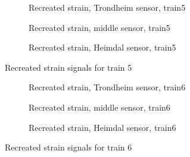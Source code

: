 \begin{figure}[htpb]
  \begin{subfigure}[t]{0.9\textwidth}
    \centering
    
    \caption{Recreated strain, Trondheim sensor, train5} %
    \label{recreated_sensor_trond_train5}
  \end{subfigure}
%
  \begin{subfigure}[t]{0.9\textwidth}
    \centering
    
    \caption{Recreated strain, middle sensor, train5} %
    \label{recreated_sensor_middle_train5}
  \end{subfigure}
%
  \begin{subfigure}[t]{0.9\textwidth}
    \centering
    
    \caption{Recreated strain, Heimdal sensor, train5} %
    \label{recreated_sensor_heimdal_train5}
  \end{subfigure}
%
  \caption{Recreated strain signals for train 5}
  \label{fig:recreated_strains_train5}
\end{figure}
%
%
%
\newpage
\begin{figure}[htpb]
  \begin{subfigure}[t]{0.9\textwidth}
    \centering
    
    \caption{Recreated strain, Trondheim sensor, train6} %
    \label{recreated_sensor_trond_train6}
  \end{subfigure}
%
  \begin{subfigure}[t]{0.9\textwidth}
    \centering
    
    \caption{Recreated strain, middle sensor, train6} %
    \label{recreated_sensor_middle_train6}
  \end{subfigure}
%
  \begin{subfigure}[t]{0.9\textwidth}
    \centering
    
    \caption{Recreated strain, Heimdal sensor, train6} %
    \label{recreated_sensor_heimdal_train6}
  \end{subfigure}
%
  \caption{Recreated strain signals for train 6}
  \label{fig:recreated_strains_train6}
\end{figure}
%
